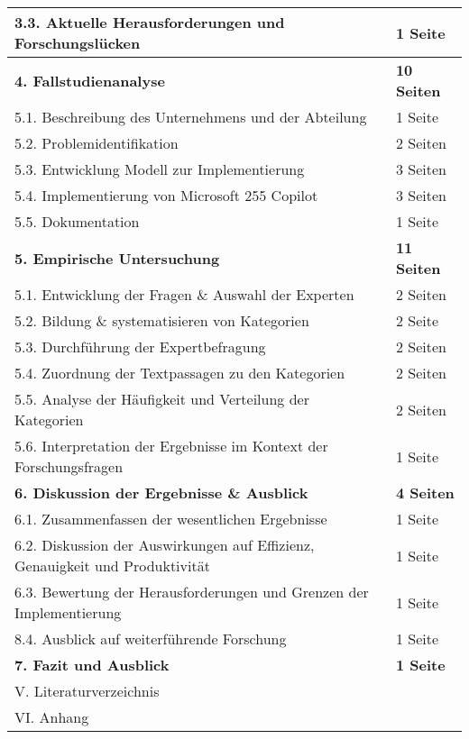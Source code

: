 \begin{longtable}{|p{9cm}|p{2.5cm}|}
        \hline
        3.3. Aktuelle Herausforderungen und Forschungslücken & 1 Seite \\
    \hline
    \textbf{4. Fallstudienanalyse} & \textbf{10 Seiten} \\
    \hline
        5.1. Beschreibung des Unternehmens und der Abteilung & 1 Seite \\
        \hline
        5.2. Problemidentifikation & 2 Seiten \\
        \hline
        5.3. Entwicklung Modell zur Implementierung & 3 Seiten \\
        \hline
        5.4. Implementierung von Microsoft 255 Copilot & 3 Seiten \\
        \hline
        5.5. Dokumentation & 1 Seite \\
    \hline
    \textbf{5. Empirische Untersuchung} & \textbf{11 Seiten} \\
    \hline
        5.1. Entwicklung der Fragen \& Auswahl der Experten & 2 Seiten \\
        \hline
        5.2. Bildung \& systematisieren von Kategorien & 2 Seite \\
        \hline
        5.3. Durchführung der Expertbefragung & 2 Seiten \\
        \hline
        5.4. Zuordnung der Textpassagen zu den Kategorien & 2 Seiten \\
        \hline
        5.5. Analyse der Häufigkeit und Verteilung der Kategorien & 2 Seiten \\
        \hline
        5.6. Interpretation der Ergebnisse im Kontext der Forschungsfragen & 1 Seite \\
    \hline
    \textbf{6. Diskussion der Ergebnisse \& Ausblick} & \textbf{4 Seiten} \\
    \hline
        6.1. Zusammenfassen der wesentlichen Ergebnisse & 1 Seite \\
        \hline
        6.2. Diskussion der Auswirkungen auf Effizienz, Genauigkeit und Produktivität & 1 Seite \\
        \hline
        6.3. Bewertung der Herausforderungen und Grenzen der Implementierung & 1 Seite \\
        \hline
        8.4. Ausblick auf weiterführende Forschung & 1 Seite \\
    \hline
    \textbf{7. Fazit und Ausblick} & \textbf{1 Seite} \\
    \hline
    V. Literaturverzeichnis & \\
    \hline
    VI. Anhang & \\
    \hline
\end{longtable}



\clearpage